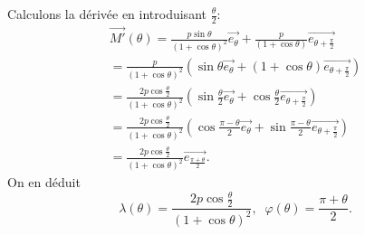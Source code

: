 Calculons la dérivée en introduisant $\frac{\theta}{2}$:
\begin{multline*}
 \overrightarrow{M'}(\theta) = \frac{p\sin \theta}{(1 + \cos \theta)^2} \overrightarrow{e_\theta}
 + \frac{p}{(1 + \cos \theta)} \overrightarrow{e_{\theta + \frac{\pi}{2}}} \\
 = \frac{p}{(1 + \cos \theta)^2} \left( \sin \theta \overrightarrow{e_\theta} + (1+\cos \theta) \overrightarrow{e_{\theta + \frac{\pi}{2}}} \right)\\
 = \frac{2 p \cos \frac{\theta}{2}}{(1 + \cos \theta)^2} \left( \sin \frac{\theta}{2} \overrightarrow{e_\theta} + \cos \frac{\theta}{2} \overrightarrow{e_{\theta + \frac{\pi}{2}}} \right)\\
 = \frac{2 p \cos \frac{\theta}{2}}{(1 + \cos \theta)^2} \left( \cos \frac{\pi - \theta}{2} \overrightarrow{e_\theta} + \sin \frac{\pi - \theta}{2} \overrightarrow{e_{\theta + \frac{\pi}{2}}} \right)\\
 = \frac{2 p \cos \frac{\theta}{2}}{(1 + \cos \theta)^2} \overrightarrow{e_{\frac{\pi + \theta}{2}}}.
\end{multline*}
On en déduit
\begin{displaymath}
 \lambda(\theta) = \frac{2 p \cos \frac{\theta}{2}}{(1 + \cos \theta)^2}, \;\;
 \varphi(\theta) = \frac{\pi + \theta}{2}.
\end{displaymath}

